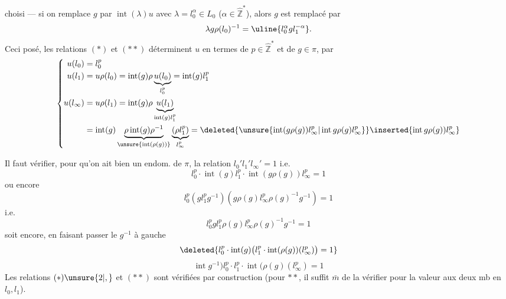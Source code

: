choisi --- si on  remplace $g$ par $\operatorname{int}(\lambda)u$ avec $\lambda=l_0^\alpha\in L_0$ ($\alpha\in\hat{\mathbb Z}^{*}$), alors $g$ est remplacé par
\[
\lambda g\rho(l_0)^{-1}=\uline{l_0^\alpha gl_1^{-\alpha}}.
\]
Ceci posé,  les relations $(*)$ et $(**)$ déterminent $u$ en termes de $p\in\hat{\mathbb Z}^{*}$ et de $g\in\pi$, par
\[
\left\{\begin{aligned}
u(l_0)&=l_0^p\\
u(l_1)&=u\rho(l_0)=\operatorname{int}(g)\rho\underbrace{u(l_0)}_{l_0^p}=\operatorname{int}(g)l_1^p\\
u(l_\infty)&=u\rho(l_1)=\operatorname{int}(g)\rho\underbrace{u(l_1)}_{\operatorname{int}(g)l_1^p}\\
&=\operatorname{int}(g)\underbrace{\rho\operatorname{int}(g)\rho^{-1}}_{\unsure{\operatorname{int}(\rho(g))}}\underbrace{(\rho l_1^p)}_{l_\infty^p}
=\deleted{\unsure{\operatorname{int}(g\rho(g))l_\infty^p|\operatorname{int}g\rho(g)l_\infty^p}}\inserted{\operatorname{int}g\rho(g))l_\infty^p}
\end{aligned}\right.
\]

Il faut vérifier, pour qu'on ait bien un endom. de $\pi$, la relation $l_0'l_1'l_\infty'=1$ i.e.
\[
\boxed{l_0^p\cdot\operatorname{int}(g)l_1^p\cdot\operatorname{int}(g\rho(g))l_\infty^p=1}
\]
ou encore
\[
l_0^p(gl_1^pg^{-1})(g\rho(g)l_\infty^p\rho(g)^{-1}g^{-1})=1
\]
i.e.
\[
l_0^pgl_1^p\rho(g)l_\infty^p\rho(g)^{-1}g^{-1}=1
\]
soit encore, en faisant passer le $g^{-1}$ à gauche
\[
\deleted{l_0^p\cdot\operatorname{int}(g)\bigl(l_1^p\cdot\operatorname{int}(\rho(g))(l_\infty^p)\bigr)=1}
\]
\[
\operatorname{int}g^{-1})l_0^p\cdot l_1^p\cdot\operatorname{int}(\rho(g)(l_\infty^p)=1
\]
Les relations $(*)\unsure{2|,}$ et $(**)$ sont vérifiées par construction (pour $**$, il suffit $\bar m$ de la vérifier pour la valeur aux deux mb en $l_0,l_1$).
